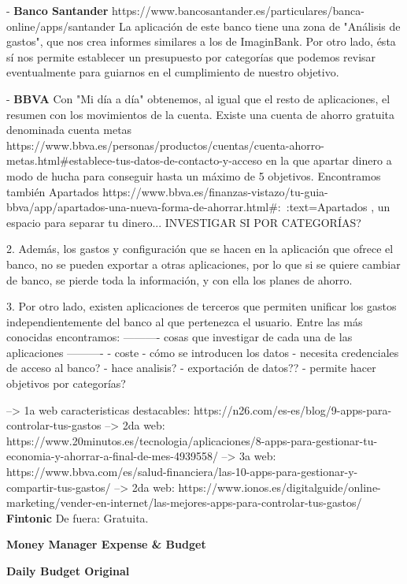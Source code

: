 - \textbf{Banco Santander}
https://www.bancosantander.es/particulares/banca-online/apps/santander
La aplicación de este banco tiene una zona de "Análisis de gastos", que nos crea 
informes similares a los de ImaginBank. 
Por otro lado, ésta sí nos permite establecer un 
presupuesto por categorías que podemos revisar eventualmente para guiarnos en el 
cumplimiento de nuestro objetivo.

- \textbf{BBVA}
Con "Mi día a día" obtenemos, al igual que el resto de aplicaciones, el resumen con los movimientos de la cuenta.
Existe una cuenta de ahorro gratuita denominada cuenta metas https://www.bbva.es/personas/productos/cuentas/cuenta-ahorro-metas.html#establece-tus-datos-de-contacto-y-acceso 
en la que apartar dinero a modo de hucha para conseguir hasta un máximo de 5 objetivos. 
Encontramos también Apartados https://www.bbva.es/finanzas-vistazo/tu-guia-bbva/app/apartados-una-nueva-forma-de-ahorrar.html#:~:text=Apartados%
, un espacio para separar tu dinero... INVESTIGAR SI POR CATEGORÍAS?


2. Además, los gastos y configuración que se hacen en la aplicación que ofrece 
el banco, no se pueden exportar a otras aplicaciones,
por lo que si se quiere cambiar de banco, se pierde toda la información, 
y con ella los planes de ahorro.

3. Por otro lado, existen aplicaciones de terceros que permiten unificar los gastos 
independientemente del banco al que pertenezca el usuario. Entre las más conocidas 
encontramos:
---------- cosas que investigar de cada una de las aplicaciones ----------
- coste 
- cómo se introducen los datos
- necesita credenciales de acceso al banco?
- hace analisis?
- exportación de datos??
- permite hacer objetivos por categorías?

--> 1a web caracteristicas destacables: https://n26.com/es-es/blog/9-apps-para-controlar-tus-gastos 
--> 2da web: https://www.20minutos.es/tecnologia/aplicaciones/8-apps-para-gestionar-tu-economia-y-ahorrar-a-final-de-mes-4939558/ 
--> 3a web: https://www.bbva.com/es/salud-financiera/las-10-apps-para-gestionar-y-compartir-tus-gastos/ 
--> 2da web: https://www.ionos.es/digitalguide/online-marketing/vender-en-internet/las-mejores-apps-para-controlar-tus-gastos/ 
\textbf{Fintonic} 
De fuera: Gratuita. 

\textbf{Money Manager Expense & Budget} 

\textbf{Daily Budget Original} 

